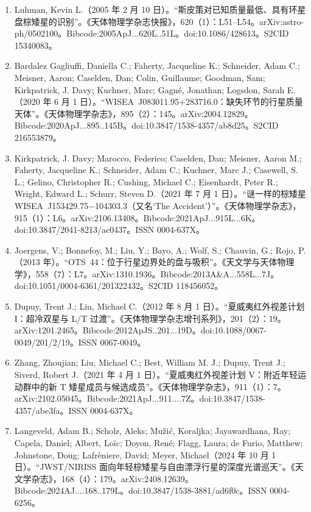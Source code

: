 \begin{enumerate}
\item Luhman, Kevin L.（2005 年 2 月 10 日）。“斯皮策对已知质量最低、具有环星盘棕矮星的识别”。《天体物理学杂志快报》，620（1）：L51--L54。arXiv:astro-ph/0502100。Bibcode:2005ApJ...620L..51L。doi:10.1086/428613。S2CID 15340083。  
\item Bardalez Gagliuffi, Daniella C.; Faherty, Jacqueline K.; Schneider, Adam C.; Meisner, Aaron; Caselden, Dan; Colin, Guillaume; Goodman, Sam; Kirkpatrick, J. Davy; Kuchner, Marc; Gagné, Jonathan; Logsdon, Sarah E.（2020 年 6 月 1 日）。“WISEA~J083011.95+283716.0：缺失环节的行星质量天体”。《天体物理学杂志》，895（2）：145。arXiv:2004.12829。Bibcode:2020ApJ...895..145B。doi:10.3847/1538-4357/ab8d25。S2CID 216553879。  
\item Kirkpatrick, J. Davy; Marocco, Federico; Caselden, Dan; Meisner, Aaron M.; Faherty, Jacqueline K.; Schneider, Adam C.; Kuchner, Marc J.; Casewell, S. L.; Gelino, Christopher R.; Cushing, Michael C.; Eisenhardt, Peter R.; Wright, Edward L.; Schurr, Steven D.（2021 年 7 月 1 日）。“谜一样的棕矮星 WISEA~J153429.75$-$104303.3（又名‘The Accident’）”。《天体物理学杂志》，915（1）：L6。arXiv:2106.13408。Bibcode:2021ApJ...915L...6K。doi:10.3847/2041-8213/ac0437。ISSN 0004-637X。  
\item Joergens, V.; Bonnefoy, M.; Liu, Y.; Bayo, A.; Wolf, S.; Chauvin, G.; Rojo, P.（2013 年）。“OTS~44：位于行星边界处的盘与吸积”。《天文学与天体物理学》，558（7）：L7。arXiv:1310.1936。Bibcode:2013A\&A...558L...7J。doi:10.1051/0004-6361/201322432。S2CID 118456052。  
\item Dupuy, Trent J.; Liu, Michael C.（2012 年 8 月 1 日）。“夏威夷红外视差计划 I：超冷双星与 L/T 过渡”。《天体物理学杂志增刊系列》，201（2）：19。arXiv:1201.2465。Bibcode:2012ApJS..201...19D。doi:10.1088/0067-0049/201/2/19。ISSN 0067-0049。  
\item Zhang, Zhoujian; Liu, Michael C.; Best, William M. J.; Dupuy, Trent J.; Siverd, Robert J.（2021 年 4 月 1 日）。“夏威夷红外视差计划 V：附近年轻运动群中的新 T 矮星成员与候选成员”。《天体物理学杂志》，911（1）：7。arXiv:2102.05045。Bibcode:2021ApJ...911....7Z。doi:10.3847/1538-4357/abe3fa。ISSN 0004-637X。  
\item Langeveld, Adam B.; Scholz, Aleks; Mužić, Koraljka; Jayawardhana, Ray; Capela, Daniel; Albert, Loïc; Doyon, René; Flagg, Laura; de Furio, Matthew; Johnstone, Doug; Lafrèniere, David; Meyer, Michael（2024 年 10 月 1 日）。“JWST/NIRISS 面向年轻棕矮星与自由漂浮行星的深度光谱巡天”。《天文学杂志》，168（4）：179。arXiv:2408.12639。Bibcode:2024AJ....168..179L。doi:10.3847/1538-3881/ad6f0c。ISSN 0004-6256。  

\end{enumerate}
